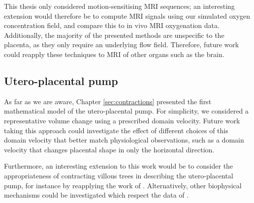             This thesis only considered motion-sensitising MRI sequences; an interesting extension would therefore be to compute MRI signals using our simulated oxygen concentration field, and compare this to in vivo MRI oxygenation data. Additionally, the majority of the presented methods are unspecific to the placenta, as they only require an underlying flow field. Therefore, future work could reapply these techniques to MRI of other organs such as the brain.

        \subsection{Utero-placental pump}

            As far as we are aware, Chapter \ref{sec:contractions} presented the first mathematical model of the utero-placental pump. For simplicity, we considered a representative volume change using a prescribed domain velocity. Future work taking this approach could investigate the effect of different choices of this domain velocity that better match physiological observations, such as a domain velocity that changes placental shape in only the horizontal direction.
            
            Furthermore, an interesting extension to this work would be to consider the appropriateness of contracting villous trees in describing the utero-placental pump, for instance by reapplying the work of \citeauthor{katoVillousTreeModel2017} \cite{katoVillousTreeModel2017}. Alternatively, other biophysical mechanisms could be investigated which respect the data of \citeauthor{gowlandCharacterisingPlacentalContractions2024} \cite{gowlandCharacterisingPlacentalContractions2024}.
            
